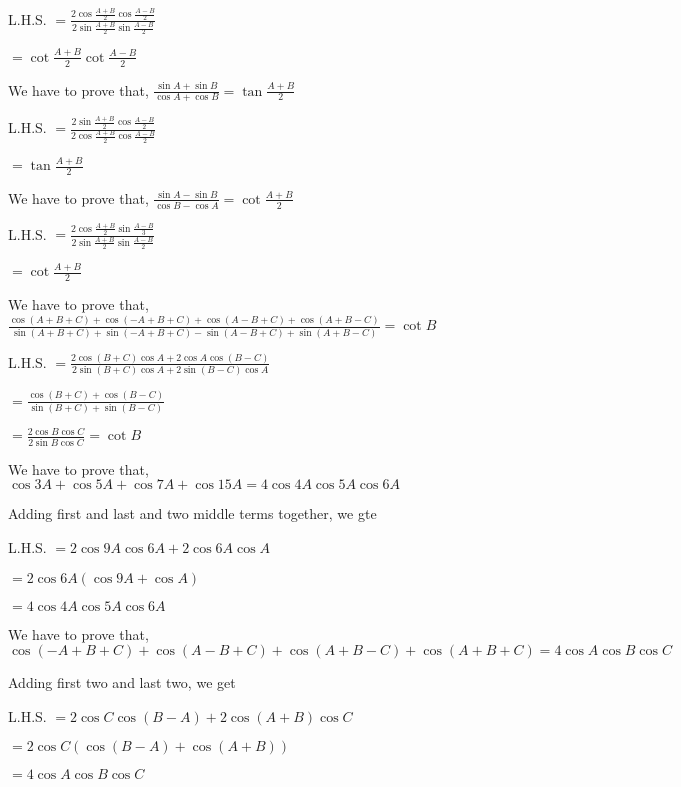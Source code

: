   L.H.S. $= \frac{2\cos\frac{A + B}{2}\cos\frac{A - B}{2}}{2\sin\frac{A + B}{2}\sin\frac{A - B}{2}}$

  $= \cot\frac{A + B}{2}\cot\frac{A - B}{2}$

\item We have to prove that, $\frac{\sin A + \sin B}{\cos A + \cos B} = \tan \frac{A + B}{2}$

  L.H.S. $= \frac{2\sin\frac{A + B}{2}\cos\frac{A - B}{2}}{2\cos\frac{A + B}{2}\cos\frac{A - B}{2}}$

  $= \tan \frac{A + B}{2}$

\item We have to prove that, $\frac{\sin A - \sin B}{\cos B - \cos A} = \cot \frac{A + B}{2}$

  L.H.S. $= \frac{2\cos\frac{A + B}{2}\sin\frac{A - B}{3}}{2\sin\frac{A + B}{2}\sin\frac{A - B}{2}}$

  $= \cot \frac{A + B}{2}$

\item We have to prove that, $\frac{\cos(A + B + C) + \cos(-A + B + C) + \cos(A - B + C) + \cos(A + B - C)}{\sin(A + B +
  C)+\sin(-A + B + C) - \sin(A - B + C) + \sin(A + B - C)} = \cot B$

  L.H.S. $= \frac{2\cos(B + C)\cos A + 2\cos A\cos(B - C)}{2\sin(B + C)\cos A + 2\sin(B - C)\cos A}$

  $= \frac{\cos(B + C) + \cos(B - C)}{\sin(B + C) + \sin(B - C)}$

  $= \frac{2\cos B\cos C}{2\sin B\cos C} = \cot B$

\item We have to prove that, $\cos 3A + \cos 5A + \cos 7A + \cos 15A = 4 \cos 4A\cos 5A \cos 6A$

  Adding first and last and two middle terms together, we gte

  L.H.S. $= 2\cos9A\cos6A + 2\cos6A\cos A$

  $= 2\cos6A(\cos9A + \cos A)$

  $= 4\cos 4A \cos 5A \cos 6A$

\item We have to prove that, $\cos(-A + B + C) + \cos(A - B + C) + \cos(A + B - C) + \cos(A + B + C) = 4\cos A\cos B\cos C$

  Adding first two and last two, we get

  L.H.S. $= 2\cos C\cos (B - A) + 2\cos (A + B)\cos C$

  $= 2\cos C(\cos (B - A) + \cos (A + B))$

  $= 4\cos A\cos B\cos C$

